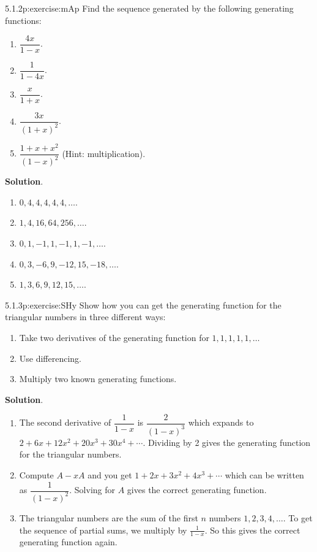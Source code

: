 \documentclass[twoside,11pt,]{book}
\newcommand{\blocktitlefont}{\relax}
\numberwithin{equation}{chapter}
\begin{document}
\begin{divisionsolution}{5.1.2}{}{p:exercise:mAp}%
Find the sequence generated by the following generating functions:%
\begin{enumerate}[label=(\alph*)]
\item{}\(\dfrac{4x}{1-x}\).%
\item{}\(\dfrac{1}{1-4x}\).%
\item{}\(\dfrac{x}{1+x}\).%
\item{}\(\dfrac{3x}{(1+x)^2}\).%
\item{}\(\dfrac{1+x+x^2}{(1-x)^2}\) (Hint: multiplication).%
\end{enumerate}
%
\par\smallskip%
\noindent\textbf{\blocktitlefont Solution}.\quad{}%
\begin{enumerate}[label=(\alph*)]
\item{}\(0, 4, 4, 4, 4, 4, \ldots\).%
\item{}\(1, 4, 16, 64, 256, \ldots\).%
\item{}\(0, 1, -1, 1, -1, 1, -1, \ldots\).%
\item{}\(0, 3, -6, 9, -12, 15, -18, \ldots\).%
\item{}\(1, 3, 6, 9, 12, 15, \ldots\).%
\end{enumerate}
%
\end{divisionsolution}%
\begin{divisionsolution}{5.1.3}{}{p:exercise:SHy}%
Show how you can get the generating function for the triangular numbers in three different ways:%
\begin{enumerate}[label=(\alph*)]
\item{}Take two derivatives of the generating function for \(1,1,1,1,1, \ldots\)%
\item{}Use differencing.%
\item{}Multiply two known generating functions.%
\end{enumerate}
%
\par\smallskip%
\noindent\textbf{\blocktitlefont Solution}.\quad{}%
\begin{enumerate}[label=(\alph*)]
\item{}The second derivative of \(\dfrac{1}{1-x}\) is \(\dfrac{2}{(1-x)^3}\) which expands to \(2 + 6x + 12x^2 + 20x^3 + 30x^4 + \cdots\). Dividing by 2 gives the generating function for the triangular numbers.%
\item{}Compute \(A - xA\) and you get \(1 + 2x + 3x^2 + 4x^3 + \cdots\) which can be written as \(\dfrac{1}{(1-x)^2}\). Solving for \(A\) gives the correct generating function.%
\item{}The triangular numbers are the sum of the first \(n\) numbers \(1,2,3,4, \ldots\). To get the sequence of partial sums, we multiply by \(\frac{1}{1-x}\). So this gives the correct generating function again.%
\end{enumerate}
%
\end{divisionsolution}%
\end{document}
